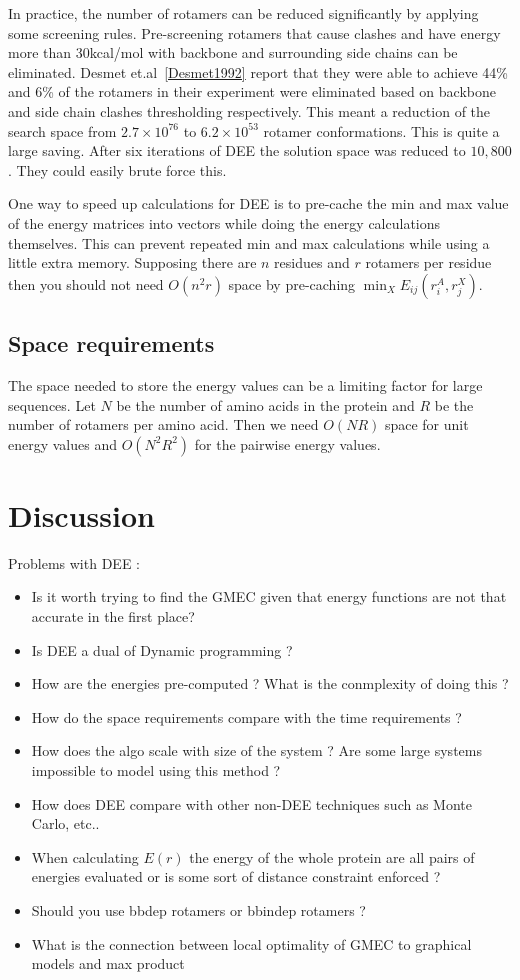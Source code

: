\documentclass[a4]{article}
\begin{document}
In practice, the number of rotamers can be reduced significantly by applying some screening rules. Pre-screening rotamers that cause clashes and have energy more than 30kcal/mol with backbone and surrounding side chains can be eliminated. Desmet et.al~\ref{Desmet1992} report  that they were able to achieve 44\% and 6\% of the rotamers in their experiment were eliminated based on backbone and side chain clashes thresholding respectively. This meant a reduction of the search space from $2.7\times10^{76}$ to $6.2\times10^{53}$ rotamer conformations. This is quite a large saving. After six iterations of DEE the solution space was reduced to $10,800$. They could easily brute force this. 

One way to speed up calculations for DEE is to pre-cache the min and max value of the energy matrices into vectors while doing the energy calculations themselves. This can prevent repeated min and max calculations while using a little extra memory. Supposing there are $n$ residues and $r$ rotamers per residue then you should not need $O(n^2r)$ space by pre-caching $\min_X E_{ij}(r_i^A,r_j^X)$.

\subsection{Space requirements}
The space needed to store the energy values can be a limiting factor for large sequences. Let $N$ be the number of amino acids in the protein and $R$ be the number of rotamers per amino acid. Then we need $O(NR)$ space for unit energy values and $O(N^2R^2)$ for the pairwise energy values. 

\section{Discussion}

Problems with DEE :
\begin{itemize}
\item Is it worth trying to find the GMEC given that energy functions are not that accurate in the first place?
\item Is DEE a dual of Dynamic programming ? 
\item How are the energies pre-computed ? What is the conmplexity of doing this ?
\item How do the space requirements compare with the time requirements ?
\item How does the algo scale with size of the system ? Are some large systems impossible to model using this method ? 
\item How does DEE compare with other non-DEE techniques such as Monte Carlo, etc..
\item When calculating $E(r)$ the energy of the whole protein are all pairs of energies evaluated or is some sort of distance constraint enforced ?
\item Should you use bbdep rotamers or bbindep rotamers ?
\item What is the connection between local optimality of GMEC to graphical models and max product
\end{itemize}
\end{document}
